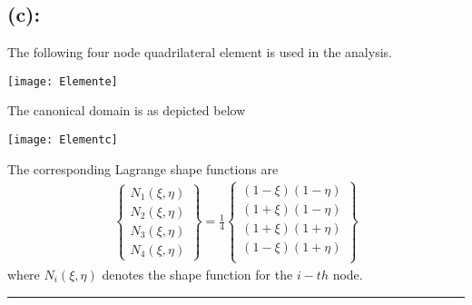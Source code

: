\subsection*{(c): }
The following four node quadrilateral element is used in the analysis. 
\begin{center}
\hspace{-1.5in}
\texttt{[image: Elemente]} \\
\end{center}
The canonical domain is as depicted below
\begin{center}
\hspace{-1.5in}
\texttt{[image: Elementc]} \\
\end{center}
The corresponding Lagrange shape functions are
\begin{align*}
\begin{Bmatrix}
N_1(\xi,\eta)\\
N_2(\xi,\eta)\\
N_3(\xi,\eta)\\
N_4(\xi,\eta)
\end{Bmatrix}
=
\frac{1}{4}
\begin{Bmatrix}
(1-\xi) (1-\eta)\\
(1+\xi) (1-\eta)\\
(1+\xi) (1+\eta)\\
(1-\xi) (1+\eta)\\
\end{Bmatrix}
\end{align*}
where $N_i(\xi,\eta)$ denotes the shape function for the $i-th$ node.  \\ \hrule
